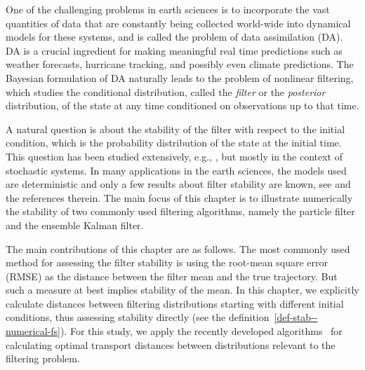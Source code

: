 

One of the challenging problems in earth sciences is to incorporate the vast quantities of data that are constantly being collected world-wide into dynamical models for these systems, and is called the problem of data assimilation (DA). DA is a crucial ingredient for making meaningful real time predictions such as weather forecasts, hurricane tracking, and possibly even climate predictions. \cite{asch2016data, carrassi2018data} The Bayesian formulation of DA naturally leads to the problem of nonlinear filtering, which studies the conditional distribution, called the \emph{filter} or the \emph{posterior} distribution, of the state at any time conditioned on observations up to that time. \cite{ApteH07, law2015data, reich2015probabilistic}

A natural question is about the stability of the filter with respect to the initial condition, which is the probability distribution of the state at the initial time. This question has been studied extensively, e.g., \cite{bishop2017stability, chigansky2006stability}, but mostly in the context of stochastic systems. In many applications in the earth sciences, the models used are deterministic and only a few results about filter stability are known, see {\cite{reddy2019asymptotic,  reddy2021stability}} and the references therein. The main focus of this chapter is to illustrate numerically the stability of two commonly used filtering algorithms, namely the particle filter and the ensemble Kalman filter.

The main contributions of this chapter are as follows. The most commonly used method for assessing the filter stability is using the root-mean square error (RMSE) as the distance between the filter mean and the true trajectory. But such a measure at best implies stability of the mean. In this chapter, we explicitly calculate distances between filtering distributions starting with different initial conditions, thus assessing stability directly (see the definition~\ref{def-stab--numerical-fs}). For this study, we apply the recently developed algorithms~\cite{feydy2019interpolating, genevay2019entropy, thibault2021overrelaxed} for calculating optimal transport distances between distributions relevant to the filtering problem.

